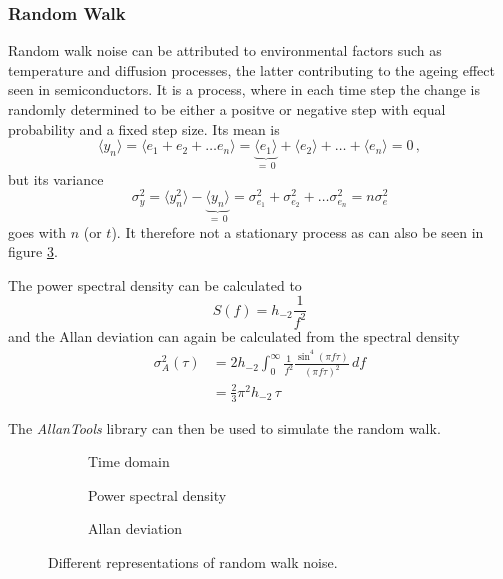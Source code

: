 \clearpage
\subsubsection{Random Walk}%
\label{sec:random_walk}
Random walk noise can be attributed to environmental factors such as temperature \cite{random_walk_fm} and diffusion processes, the latter contributing to the ageing effect seen in semiconductors.
It is a process, where in each time step the change is randomly determined to be either a positve or negative step with equal probability and a fixed step size. Its mean is
\begin{equation}
    \langle y_n \rangle = \langle e_1 + e_2 + \dots e_n \rangle = \underbrace{\langle e_1 \rangle}_{=\,0} + \langle e_2 \rangle + \dots + \langle e_n \rangle = 0 \, ,
\end{equation}
but its variance
\begin{equation}
    \sigma_y^2 = \langle y_n^2 \rangle - \underbrace{\langle y_n \rangle}_{=\,0} = \sigma_{e_1}^2 + \sigma_{e_2}^2 + \dots \sigma_{e_n}^2 = n \sigma_e^2
\end{equation}
goes with $n$ (or $t$). It therefore not a stationary process as can also be seen in figure \ref{fig:random_walk_adev}.

The power spectral density can be calculated \cite{psd_to_adev,noise_generation} to
\begin{equation}
    S(f) = h_{-2} \frac{1}{f^2}
\end{equation}
and the Allan deviation can again be calculated from the spectral density
\begin{align}
    \sigma_A^2(\tau) &= 2 h_{-2} \int_0^\infty \frac{1}{f^2} \frac{\sin^4\left( \pi f \tau \right)}{(\pi f \tau)^2}\,df \nonumber\\
    &=\frac{2}{3} \pi^2 h_{-2}\, \tau
\end{align}

The \textit{AllanTools} library \cite{allantools} can then be used to simulate the random walk.

\begin{figure}[ht]
    \centering
    \begin{subfigure}{0.32\linewidth}
        \centering
        \scalebox{0.75}{%
            
        } %
        \caption{Time domain}
        \label{fig:random_walk_time}
    \end{subfigure}
    \begin{subfigure}{0.32\linewidth}
        \centering
        \scalebox{0.75}{%
            
        } %
        \caption{Power spectral density}
        \label{fig:random_walk_psd}
    \end{subfigure}
    \begin{subfigure}{0.32\linewidth}
        \centering
        \scalebox{0.75}{%
            
        } %
        \caption{Allan deviation}
        \label{fig:random_walk_adev}
    \end{subfigure}
    \caption{Different representations of random walk noise.}
    \label{fig:random_walk_noise_simulated}
\end{figure}


